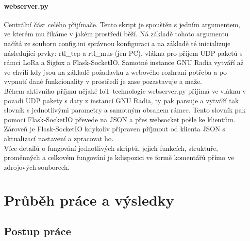 \documentclass{ctuthesis}
\begin{document}
\subsubsection{webserver.py}
Centrální část celého přijímače. Tento skript je spouštěn s jedním argumentem, ve kterém mu říkáme v jakém prostředí běží. Ná základě tohoto argumentu načítá ze souboru config.ini správnou konfiguraci a na základě té inicializuje následující prvky: rtl\_tcp a rtl\_mus (jen PC), vlákna pro příjem UDP paketů s rámci LoRa a Sigfox a Flask-SocketIO. Samotné instance GNU Radia vytváří až ve chvíli kdy jsou na základě požadavku z webového rozhraní potřeba a po vypnutí dané funkcionality v prostředí je zase pozastavuje a maže.\\
Během aktivního příjmu nějaké IoT technologie webserver.py přijímá ve vláknu v pozadí UDP pakety s daty z instancí GNU Radia, ty pak parsuje a vytváří tak slovník s jednotlivými parametry a samotným obsahem rámce. Tento slovník pak pomocí Flask-SocketIO převede na JSON a přes websocket pošle ke klientům. Zároveň je Flask-SocketIO kdykoliv připraven příjmout od klienta JSON s aktualizací nastavení a zpracovat ho.\\
Více detailů o fungování jednotlivých skriptů, jejich funkcích, struktuře, proměnných a celkovém fungování je kdispozici ve formě komentářů přímo ve zdrojových souborech.




\chapter{Průběh práce a výsledky} \label{results}
\section{Postup práce}
\end{document}
